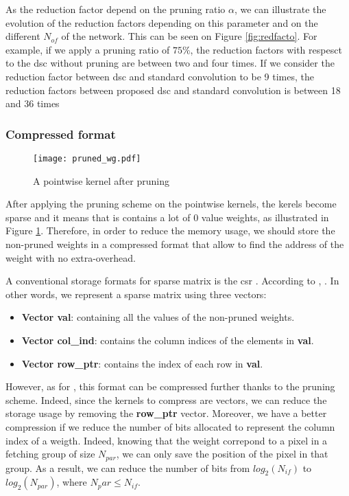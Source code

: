 %
As the reduction factor depend on the pruning ratio $\alpha$, we can illustrate the evolution of the reduction factors depending on this parameter and on the different $N_{of}$ of the network. This can be seen on Figure \ref{fig:redfacto}. For example, if we apply a pruning ratio of $75\%$, the reduction factors with respesct to the \acrshort{dsc} without pruning are between two and four times. If we consider the reduction factor between \acrshort{dsc} and standard convolution to be 9 times, the reduction factors between proposed \acrshort{dsc} and standard convolution is between 18 and 36 times
%
\subsubsection{Compressed format}
%
\begin{figure}
    \centering
    \texttt{[image: pruned\_wg.pdf]}
    \caption{A pointwise kernel after pruning}
    \label{fig:pruned_wg}
\end{figure}
%
After applying the pruning scheme on the pointwise kernels, the kerels become sparse and it means that is contains a lot of 0 value weights, as illustrated in Figure \ref{fig:pruned_wg}. Therefore, in order to reduce the memory usage, we should store the non-pruned weights in a compressed format that allow to find the address of the weight with no extra-overhead.

A conventional storage formats for sparse matrix is the \acrfull{csr} \cite{buluc_parallel_2009}. According to \textcite{buluc_parallel_2009}, . In other words, we represent a sparse matrix using three vectors:
%
\begin{itemize}
    \item \textbf{Vector val}: containing all the values of the non-pruned weights.
    \item \textbf{Vector col\_ind}: contains the column indices of the elements in \textbf{val}.
    \item \textbf{Vector row\_ptr}: contains the index of each row in \textbf{val}.
\end{itemize}
%
However, as for \cite{zhu_efficient_2020}, this format can be compressed further thanks to the pruning scheme. Indeed, since the kernels to compress are vectors, we can reduce the storage usage by removing the \textbf{row\_ptr} vector. Moreover, we have a better compression if we reduce the number of bits allocated to represent the column index of a weigth. Indeed, knowing that the weight correpond to a pixel in a fetching group of size $N_{par}$, we can only save the position of the pixel in that group. As a result, we can reduce the number of bits from $log_2(N_{if})$ to $log_2(N_{par})$, where $N_par \leq N_{if}$.


